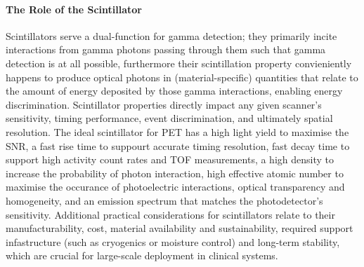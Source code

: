 \paragraph{The Role of the Scintillator}
Scintillators serve a dual-function for gamma detection; they primarily incite interactions from gamma photons passing through them such that gamma detection is at all possible, furthermore their scintillation property convieniently happens to produce optical photons in (material-specific) quantities that relate to the amount of energy deposited by those gamma interactions, enabling energy discrimination.
Scintillator properties directly impact any given scanner's sensitivity, timing performance, event discrimination, and ultimately spatial resolution.
The ideal scintillator for PET has a high light yield to maximise the SNR, a fast rise time to suppourt accurate timing resolution, fast decay time to support high activity count rates and TOF measurements, a high density to increase the probability of photon interaction, high effective atomic number to maximise the occurance of photoelectric interactions, optical transparency and homogeneity, and an emission spectrum that matches the photodetector's sensitivity.
Additional practical considerations for scintillators relate to their manufacturability, cost, material availability and sustainability, required support infastructure (such as cryogenics or moisture control) and long-term stability, which are crucial for large-scale deployment in clinical systems.

